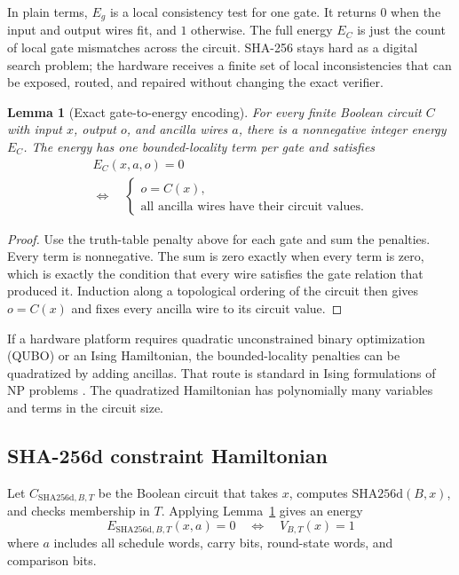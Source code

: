 \documentclass[11pt]{article}
\newtheorem{lemma}[theorem]{Lemma}
\theoremstyle{definition}
\theoremstyle{remark}
\newcommand{\shaD}{\mathrm{SHA256d}}
\begin{document}
In plain terms, \(E_g\) is a local consistency test for one gate. It returns
\(0\) when the input and output wires fit, and \(1\) otherwise. The full energy
\(E_C\) is just the count of local gate mismatches across the circuit. SHA-256
stays hard as a digital search problem; the hardware receives a finite set of
local inconsistencies that can be exposed, routed, and repaired without changing
the exact verifier.

\begin{lemma}[Exact gate-to-energy encoding]
\label{lem:gateenergy}
For every finite Boolean circuit \(C\) with input \(x\), output \(o\), and
ancilla wires \(a\), there is a nonnegative integer energy \(E_C\). The energy
has one bounded-locality term per gate and satisfies
\[
\begin{gathered}
E_C(x,a,o)=0\\
\Longleftrightarrow\quad
\begin{cases}
o=C(x),\\
\text{all ancilla wires have their circuit values}.
\end{cases}
\end{gathered}
\]
\end{lemma}

\begin{proof}
Use the truth-table penalty above for each gate and sum the penalties. Every
term is nonnegative. The sum is zero exactly when every term is zero, which is
exactly the condition that every wire satisfies the gate relation that produced
it. Induction along a topological ordering of the circuit then gives
\(o=C(x)\) and fixes every ancilla wire to its circuit value.
\end{proof}

If a hardware platform requires quadratic unconstrained binary optimization
(QUBO) or an Ising Hamiltonian, the bounded-locality penalties can be
quadratized by adding ancillas. That route is standard in Ising
formulations of NP problems \cite{Lucas2014}. The quadratized Hamiltonian has
polynomially many variables and terms in the circuit size.

\subsection{SHA-256d constraint Hamiltonian}

Let \(C_{\shaD,B,T}\) be the Boolean circuit that takes \(x\), computes
\(\shaD(B,x)\), and checks membership in \(T\). Applying
Lemma~\ref{lem:gateenergy} gives an energy
\[
E_{\shaD,B,T}(x,a)=0
\quad\Longleftrightarrow\quad
V_{B,T}(x)=1
\]
where \(a\) includes all schedule words, carry bits, round-state words, and
comparison bits.
\end{document}
